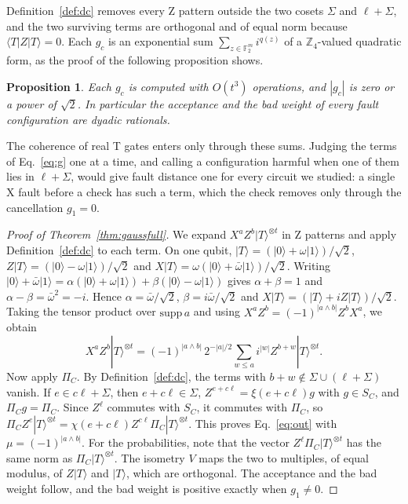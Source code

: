 \documentclass[aps,prl,reprint,twocolumn,amsmath,amssymb,floatfix,nofootinbib,superscriptaddress]{revtex4-2}
\newtheorem{proposition}[theorem]{Proposition}
\theoremstyle{definition}
\theoremstyle{remark}
\newcommand{\F}{\mathbb F_2}
\newcommand{\Z}{\mathbb Z}
\begin{document}
Definition~\ref{def:dc} removes every Z pattern outside the two cosets $\Sigma$ and $\ell+\Sigma$, and the two surviving terms are orthogonal and of equal norm because $\langle T|Z|T\rangle=0$. Each $g_c$ is an exponential sum $\sum_{z\in\F^m}i^{q(z)}$ of a $\Z_4$-valued quadratic form, as the proof of the following proposition shows.
\begin{proposition}\label{prop:poly}
Each $g_c$ is computed with $O(t^3)$ operations, and $|g_c|$ is zero or a power of $\sqrt2$. In particular the acceptance and the bad weight of every fault configuration are dyadic rationals.
\end{proposition}
The coherence of real T gates enters only through these sums. Judging the terms of Eq.~\eqref{eq:g} one at a time, and calling a configuration harmful when one of them lies in $\ell+\Sigma$, would give fault distance one for every circuit we studied: a single X fault before a check has such a term, which the check removes only through the cancellation $g_1=0$.

\begin{proof}[Proof of Theorem~\ref{thm:gaussfull}]
We expand $X^aZ^b|T\rangle^{\otimes t}$ in Z patterns and apply Definition~\ref{def:dc} to each term. On one qubit, $|T\rangle=(|0\rangle+\omega|1\rangle)/\sqrt2$, $Z|T\rangle=(|0\rangle-\omega|1\rangle)/\sqrt2$ and $X|T\rangle=\omega(|0\rangle+\bar\omega|1\rangle)/\sqrt2$. Writing $|0\rangle+\bar\omega|1\rangle=\alpha(|0\rangle+\omega|1\rangle)+\beta(|0\rangle-\omega|1\rangle)$ gives $\alpha+\beta=1$ and $\alpha-\beta=\bar\omega^2=-i$. Hence $\alpha=\bar\omega/\sqrt2$, $\beta=i\bar\omega/\sqrt2$ and $X|T\rangle=(|T\rangle+iZ|T\rangle)/\sqrt2$. Taking the tensor product over $\mathrm{supp}\,a$ and using $X^aZ^b=(-1)^{|a\wedge b|}Z^bX^a$, we obtain
\begin{equation}
 X^aZ^b|T\rangle^{\otimes t}=(-1)^{|a\wedge b|}\,2^{-|a|/2}\sum_{w\leq a}i^{|w|}Z^{b+w}|T\rangle^{\otimes t}.
\end{equation}
Now apply $\Pi_C$. By Definition~\ref{def:dc}, the terms with $b+w\notin\Sigma\cup(\ell+\Sigma)$ vanish. If $e\in c\ell+\Sigma$, then $e+c\ell\in\Sigma$, $Z^{e+c\ell}=\xi(e+c\ell)g$ with $g\in S_C$, and $\Pi_Cg=\Pi_C$. Since $Z^\ell$ commutes with $S_C$, it commutes with $\Pi_C$, so $\Pi_CZ^e|T\rangle^{\otimes t}=\chi(e+c\ell)Z^{c\ell}\Pi_C|T\rangle^{\otimes t}$. This proves Eq.~\eqref{eq:out} with $\mu=(-1)^{|a\wedge b|}$. For the probabilities, note that the vector $Z^\ell\Pi_C|T\rangle^{\otimes t}$ has the same norm as $\Pi_C|T\rangle^{\otimes t}$. The isometry $V$ maps the two to multiples, of equal modulus, of $Z|T\rangle$ and $|T\rangle$, which are orthogonal. The acceptance and the bad weight follow, and the bad weight is positive exactly when $g_1\neq0$.
\end{proof}
\end{document}
